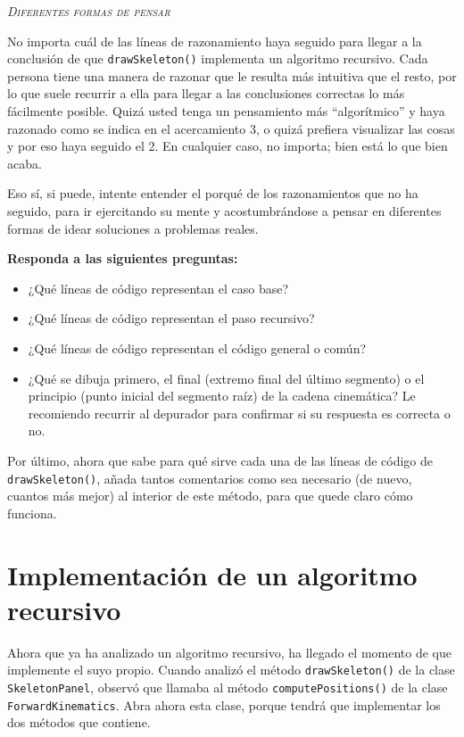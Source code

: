 \documentclass[10pt,a4paper,spanish]{article}
\newcommand{\sombreado}[2]{
  \begin{shaded}
    \begin{center} \emph{\textsc{#1}} \end{center}
    \noindent #2\\
  \end{shaded}
}
\newcommand{\code}[1]{\texttt{#1}}
\begin{document}
\sombreado{Diferentes formas de pensar}{No importa cuál de las líneas de razonamiento haya seguido para llegar a la conclusión de que \code{drawSkeleton()} implementa un algoritmo recursivo. Cada persona tiene una manera de razonar que le resulta más intuitiva que el resto, por lo que suele recurrir a ella para llegar a las conclusiones correctas lo más fácilmente posible. Quizá usted tenga un pensamiento más ``algorítmico'' y haya razonado como se indica en el acercamiento 3, o quizá prefiera visualizar las cosas y por eso haya seguido el 2. En cualquier caso, no importa; bien está lo que bien acaba.

Eso sí, si puede, intente entender el porqué de los razonamientos que no ha seguido, para ir ejercitando su mente y acostumbrándose a pensar en diferentes formas de idear soluciones a problemas reales.}

\textbf{Responda a las siguientes preguntas:}

\begin{itemize}
    \item ¿Qué líneas de código representan el caso base?
    \item ¿Qué líneas de código representan el paso recursivo?
    \item ¿Qué líneas de código representan el código general o común?
    \item ¿Qué se dibuja primero, el final (extremo final del último segmento) o el principio (punto inicial del segmento raíz) de la cadena cinemática? Le recomiendo recurrir al depurador para confirmar si su respuesta es correcta o no.
\end{itemize}

Por último, ahora que sabe para qué sirve cada una de las líneas de código de \code{drawSkeleton()}, añada tantos comentarios como sea necesario (de nuevo, cuantos más mejor) al interior de este método, para que quede claro cómo funciona.

\section{Implementación de un algoritmo recursivo}
\label{sec:recursividadImpl}

Ahora que ya ha analizado un algoritmo recursivo, ha llegado el momento de que implemente el suyo propio. Cuando analizó el método \code{drawSkeleton()} de la clase \code{SkeletonPanel}, observó que llamaba al método \code{computePositions()} de la clase \code{ForwardKinematics}. Abra ahora esta clase, porque tendrá que implementar los dos métodos que contiene.
\end{document}

